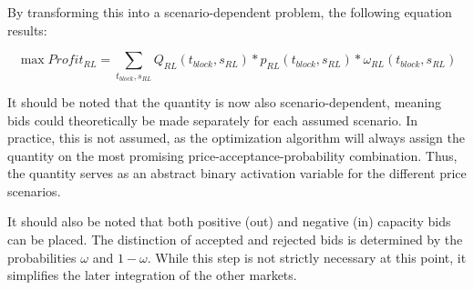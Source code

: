 By transforming this into a scenario-dependent problem, the following equation results:

\begin{equation}
	\max Profit_{RL} = \sum_{t_{block}, s_{RL}} Q_{RL}(t_{block}, s_{RL}) * p_{RL}(t_{block}, s_{RL}) * \omega_{RL}(t_{block}, s_{RL})
\end{equation}


It should be noted that the quantity is now also scenario-dependent, meaning bids could theoretically be made separately for each assumed scenario.
In practice, this is not assumed, as the optimization algorithm will always assign the quantity on the most promising price-acceptance-probability combination.
Thus, the quantity serves as an abstract binary activation variable for the different price scenarios.

It should also be noted that both positive (out) and negative (in) capacity bids can be placed.
The distinction of accepted and rejected bids is determined by the probabilities $\omega$ and $1-\omega$.
While this step is not strictly necessary at this point, it simplifies the later integration of the other markets.

